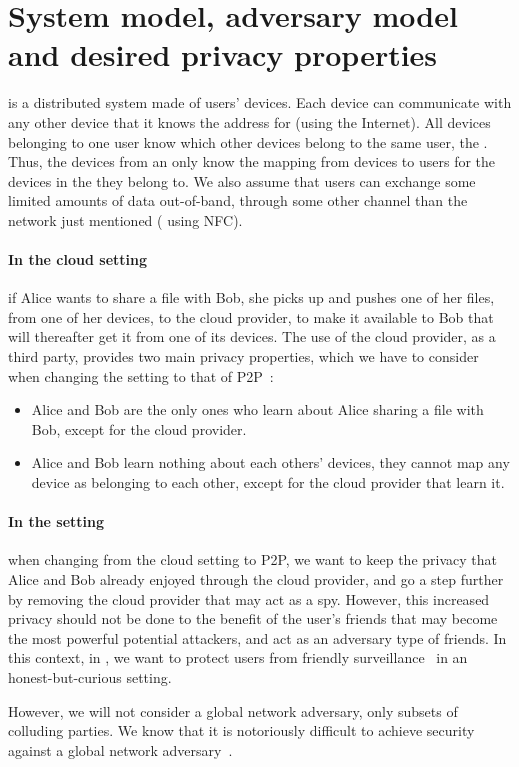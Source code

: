 \section{System model, adversary model and desired privacy properties}%
\label{system-model}

\name is a distributed system made of users' devices. 
Each device can communicate with any other device that it knows the
address for (\eg using the Internet). All devices belonging to one user
 know which other devices belong to the same user, \ie the \squad.
Thus, the devices from an \squad only know the mapping from devices to users for the devices in 
the \squad they belong to.
We also assume that users can exchange some limited amounts of data 
out-of-band, \ie through some other channel than the network just mentioned (\eg 
using \ac{NFC}).

\paragraph*{In the cloud setting} if Alice wants to share a file with
Bob, she picks up and pushes one of her files, from one of her devices, to the cloud
provider, to make it available to Bob that will thereafter get it from
one of its devices. The use of the cloud provider, as a third party,
provides two main privacy properties, which we have to consider when
changing the setting to that of \ac{P2P}~\cite{DevilInMetadata}:
\begin{itemize}
\item Alice and Bob are the only ones who learn 
about Alice sharing a file with Bob, except for the cloud provider.
\item Alice and Bob learn nothing about each others' devices, \ie 
they cannot map any device as belonging to each other, except for the
cloud provider that learn it.
\end{itemize} 

\paragraph*{In the \name setting} when changing from the cloud setting
to \ac{P2P}, we want to keep the privacy that Alice and Bob already
enjoyed through the cloud provider, and go a step further by removing 
the cloud provider that may act as a spy. However, this increased privacy
should not be done to the benefit of the user's friends that may
become the most powerful potential attackers, and act
as an adversary type of friends.
In this context, in \name, we want to protect users from friendly
surveillance~\cite{FriendlySurveillance} in an honest-but-curious setting.

However, we will not consider a global network adversary, only subsets of colluding 
parties. We know that it is notoriously difficult to achieve security against a global 
network adversary~\cite{SystemsForAnonymousCommunication}.
